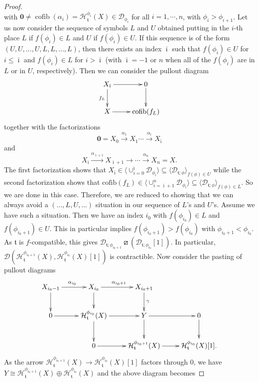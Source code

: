 \documentclass{article}
\theoremstyle{definition}
\newcommand{\tee}{\mathfrak{t}}
\newcommand{\orth}{\boxslash}
\DeclareMathOperator{\cofib}{cofib}
\begin{document}
\begin{proof}
\[\]
with $\mathbf{0} \neq \cofib(\alpha_i)=\mathcal{H}_{\tee}^{\phi_i}(X) \in \mathscr{D}_{\phi_i}$ for all $i = 1, \cdots, n$, with $\phi_i>\phi_{i+1}$. Let us now consider the sequence of symbols $L$ and $U$ obtained putting in the $i$-th place $L$ if $f(\phi_i)\in L$ and $U$ if $f(\phi_i)\in U$. If this sequence is of the form $(U,U,\dots,U,L,L,\dots,L)$, then there exists an index $\bar{\imath}$ such that
 $f(\phi_{i})\in U$ for $i\leq \bar{\imath}$ and $f(\phi_{i})\in L$ for $i>\bar{\imath}$ (with ${\bar\imath}=-1$ or $n$ when all of the $f(\phi_i)$ are in $L$ or in $U$, respectively). Then we can
consider the pullout diagram
\[
\xymatrix{
X_{{\bar\imath}}\ar[r]\ar[d]_{f_{L}}&0\ar[d]\\
X\ar[r]&\mathrm{cofib}(f_{L})
}\]
together with the factorizations
\[
\mathbf{0}=X_0 \xrightarrow{\alpha_1} X_1\cdots \xrightarrow{\alpha_{{\bar\imath}}}X_{{\bar\imath}} 
\]
and
\[
X_{{\bar\imath}}\xrightarrow{\alpha_{{\bar\imath}+1}}X_{{\bar\imath}+1}\xrightarrow{}\cdots \xrightarrow{\alpha_n} X_n=X.
\]
The first factorization shows that $X_{{\bar\imath}}\in \langle\cup_{i=0}^{{\bar\imath}}\mathscr{D}_{\phi_i}\rangle\subseteq \langle \mathscr{D}_{\tee;\phi}\rangle_{f(\phi)\in U}$ while the second factorization shows that $\mathrm{cofib}(f_{L})\in  \langle\cup_{i={\bar\imath}+1}^n\mathscr{D}_{\phi_i}\rangle\subseteq \langle \mathscr{D}_{\tee;\phi}\rangle_{f(\phi)\in L}$. So we are done in this case. Therefore, we are reduced to showing that we can always avoid a $(\dots,L,U,\dots)$ situation in our sequence of $L$'s and $U$'s. Assume we have such a situation. Then we have an index $i_0$ with $f(\phi_{i_0})\in L$ and $f(\phi_{{i_0}+1})\in U$. This in particular implies $f(\phi_{{i_0}+1})>f(\phi_{i_0})$ with $\phi_{{i_0}+1}<\phi_{i_0}$. As $\tee$ is $f$-compatible, this gives $\mathscr{D}_{\tee; \phi_{i_0+1}}\orth (\mathscr{D}_{\tee;\phi_{i_0}}[1])$. In particular, $\mathscr{D}(\mathcal{H}^{\phi_{i_0+1}}_{\tee}(X),\mathcal{H}^{\phi_{i_0}}_{\tee}(X)[1])$ is contractible. Now consider the pasting of pullout diagrams
\[
\xymatrix{X_{i_0-1}\ar[r]^{\alpha_{i_0}}\ar[d] & X_{i_0}\ar[r]^{\alpha_{i_0+1}}\ar[d] & X_{i_0+1}\ar[d]^{\gamma}\\
0\ar[r]&\mathcal{H}^{\phi_{i_0}}_{\tee}(X)\ar[d]\ar[r]&Y\ar[d]\ar[r] &0\ar[d]\\
&0\ar[r]&\mathcal{H}^{\phi_{i_0+1}}_{\tee}(X)\ar[r]&\mathcal{H}^{\phi_{i_0}}_{\tee}(X)[1].
}
\]
As the arrow $\mathcal{H}^{\phi_{i_0+1}}_{\tee}(X)\to \mathcal{H}^{\phi_{i_0}}_{\tee}(X)[1]$ factors through $0$, we have $Y\cong\mathcal{H}^{\phi_{i_0+1}}_{\tee}(X)\oplus \mathcal{H}^{\phi_{i_0}}_{\tee}(X)$ and the above diagram becomes

\end{proof}
\end{document}
